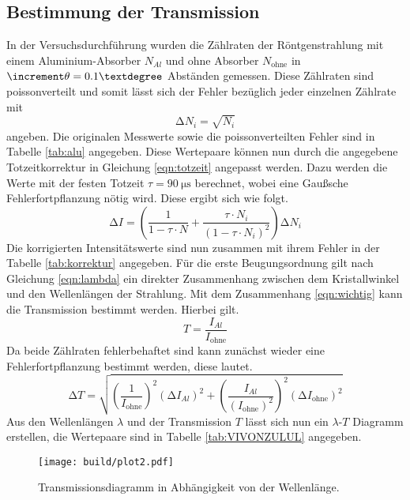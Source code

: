 \subsection{Bestimmung der Transmission}
In der Versuchsdurchführung wurden die Zählraten der Röntgenstrahlung mit einem Aluminium-Absorber $N_{Al}$ und ohne Absorber $N_{\text{ohne}}$ in $\increment \theta= 0.1\textdegree$ Abständen gemessen.
Diese Zählraten sind poissonverteilt und somit lässt sich der Fehler bezüglich jeder einzelnen Zählrate mit
\begin{equation*}
\increment N_{i} = \sqrt{N_{i}}
\end{equation*}
angeben. Die originalen Messwerte sowie die poissonverteilten Fehler sind in Tabelle \ref{tab:alu} angegeben. Diese Wertepaare können nun durch die angegebene Totzeitkorrektur in Gleichung \eqref{eqn:totzeit}
angepasst werden. Dazu werden die Werte mit der festen Totzeit $\tau = \SI{90}{\micro\second}$ berechnet, wobei eine Gaußsche Fehlerfortpflanzung nötig wird. Diese ergibt sich wie folgt.
\begin{equation*}
\increment I = \left( \frac{1}{1 - \tau \cdot N} + \frac{\tau \cdot N_{i}}{(1 - \tau \cdot N_{i})^{2}} \right) \increment N_{i}
\end{equation*}
Die korrigierten Intensitätswerte sind nun zusammen mit ihrem Fehler in der Tabelle \ref{tab:korrektur} angegeben.
Für die erste Beugungsordnung gilt nach Gleichung \eqref{eqn:lambda} ein direkter Zusammenhang zwischen dem Kristallwinkel und den Wellenlängen der Strahlung.
Mit dem Zusammenhang \eqref{eqn:wichtig} kann die Transmission bestimmt werden. Hierbei gilt.
\begin{equation*}
T = \frac{I_{Al}}{I_{\text{ohne}}}
\end{equation*}
Da beide Zählraten fehlerbehaftet sind kann zunächst wieder eine Fehlerfortpflanzung bestimmt werden, diese lautet.
\begin{equation*}
\increment T = \sqrt{\left( \frac{1}{I_{\text{ohne}}}\right)^{2} (\increment I_{Al})^{2} + \left( \frac{I_{Al}}{(I_{\text{ohne}})^{2}}\right)^{2} (\increment I_{\text{ohne}})^{2}}
\end{equation*}
Aus den Wellenlängen $\lambda$ und der Transmission $T$ lässt sich nun ein $\lambda$-$T$ Diagramm erstellen, die Wertepaare sind in Tabelle \ref{tab:VIVONZULUL} angegeben.

\begin{figure}[h]
  \centering
  \texttt{[image: build/plot2.pdf]}
  \caption{Transmissionsdiagramm in Abhängigkeit von der Wellenlänge.}
  \label{fig:plot2}
\end{figure}

